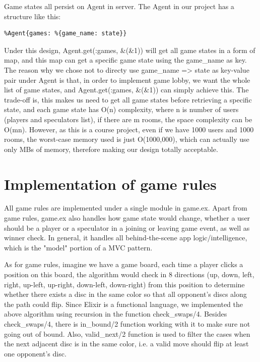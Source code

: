 Game states all persist on Agent in server. The Agent in our project has a 
structure like this:
\begin{lstlisting}
%Agent{games: %{game_name: state}}
\end{lstlisting}
Under this design, Agent.get(:games, \&(\&1)) will get all game states in a form 
of map, and this map can get a specific game state using the game\_name as key. 
The reason why we chose not to directy use {game\_name => state} as key-value 
pair under Agent is that, in order to implement game lobby, we want the whole 
list of game states, and Agent.get(:games, \&(\&1)) can simply achieve this. The 
trade-off is, this makes us need to get all game states before retrieving a 
specific state, and each game state has O(n) complexity, where n is number of 
users (players and speculators list), if there are m rooms, the space complexity 
can be O(mn). However, as this is a course project, even if we have 1000 users 
and 1000 rooms, the worst-case memory used is just O(1000,000), which can 
actually use only MBs of memory, therefore making our design totally acceptable.

\section{Implementation of game rules}
All game rules are implemented under a single module in game.ex. Apart from game rules, game.ex also handles how game state would change, whether a user should be a player or a speculator in a joining or leaving game event, as well as winner check. In general, it handles all behind-the-scene app logic/intelligence, which is the "model" portion of a MVC pattern.

As for game rules, imagine we have a game board, each time a player clicks a position on this board, the algorithm would check in 8 directions (up, down, left, right, up-left, up-right, down-left, down-right) from this position to determine whether there exists a disc in the same color so that all opponent's discs along the path could flip. Since Elixir is a functional language, we implemented the above algorithm using recursion in the function check_swaps/4. Besides check_swaps/4, there is in_bound/2 function working with it to make sure not going out of bound. Also, valid_next/2 function is used to filter the cases when the next adjacent disc is in the same color, i.e. a valid move should flip at least one opponent's disc.

